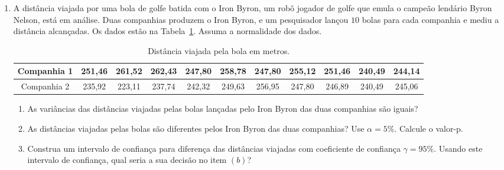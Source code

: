 \documentclass[8pt, a4paper]{article}
\begin{document}
\begin{enumerate}
	\item A distância viajada por uma bola de golfe batida com o Iron Byron, um robô jogador de golfe que emula o campeão lendário Byron Nelson, está em análise. Duas companhias produzem o Iron Byron, e um pesquisador lançou $10$ bolas para cada companhia e mediu a distância alcançadas. Os dados estão na Tabela~\ref{tab:iron-byron}. Assuma a normalidade dos dados.
	\begin{table}[ht]
		\centering
		\begin{tabular}{c|cccccccccc}
			\toprule[0.05cm]
			Companhia 1 & 251,46 & 261,52 & 262,43 & 247,80 & 258,78 & 247,80 & 255,12 & 251,46 & 240,49 & 244,14 \\ \midrule[0.025cm]
			Companhia 2 & 235,92 & 223,11 & 237,74 & 242,32 & 249,63 & 256,95 & 247,80 & 246,89 & 240,49 & 245,06 \\ 
			\bottomrule[0.05cm]
		\end{tabular}
		\caption{Distância viajada pela bola em metros.} 
		\label{tab:iron-byron}
	\end{table}
	\begin{enumerate}
		\item As variâncias das distâncias viajadas pelas bolas lançadas pelo Iron Byron das duas companhias são iguais?
		\item As distâncias viajadas pelas bolas são diferentes pelos Iron Byron das duas companhias? Use $\alpha=5\%$. Calcule o valor-p.
		\item Construa um intervalo de confiança para diferença das distâncias viajadas com coeficiente de confiança $\gamma=95\%$. Usando este intervalo de confiança, qual seria a sua decisão no item $(b)$?
	\end{enumerate}


\end{enumerate}
\end{document}
